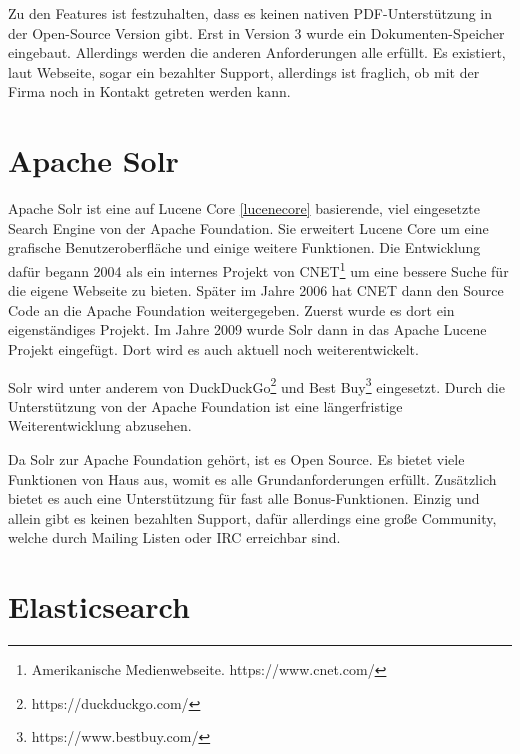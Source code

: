 Zu den Features ist festzuhalten, dass es keinen nativen PDF-Unterstützung in der Open-Source Version gibt. Erst in Version 3 wurde ein Dokumenten-Speicher eingebaut. Allerdings werden die anderen Anforderungen alle erfüllt. Es existiert, laut Webseite, sogar ein bezahlter Support, allerdings ist fraglich, ob mit der Firma noch in Kontakt getreten werden kann. \cite{SphinxTechnologiesInc.2019}

\section{Apache Solr}
\label{solr}

Apache Solr ist eine auf Lucene Core \ref{lucenecore} basierende, viel eingesetzte Search Engine von der Apache Foundation. Sie erweitert Lucene Core um eine grafische Benutzeroberfläche und einige weitere Funktionen. 
Die Entwicklung dafür begann 2004 als ein internes Projekt von CNET\footnote{Amerikanische Medienwebseite. https://www.cnet.com/} um eine bessere Suche für die eigene Webseite zu bieten. Später im Jahre 2006 hat CNET dann den Source Code an die Apache Foundation weitergegeben. Zuerst wurde es dort ein eigenständiges Projekt. Im Jahre 2009 wurde Solr dann in das Apache Lucene Projekt eingefügt. Dort wird es auch aktuell noch weiterentwickelt. \cite{Wikipedia.2019b}

Solr wird unter anderem von DuckDuckGo\footnote{https://duckduckgo.com/} und Best Buy\footnote{https://www.bestbuy.com/} eingesetzt. Durch die Unterstützung von der Apache Foundation ist eine längerfristige Weiterentwicklung abzusehen. 

Da Solr zur Apache Foundation gehört, ist es Open Source. Es bietet viele Funktionen von Haus aus, womit es alle Grundanforderungen erfüllt. Zusätzlich bietet es auch eine Unterstützung für fast alle Bonus-Funktionen. Einzig und allein gibt es keinen bezahlten Support, dafür allerdings eine große Community, welche durch Mailing Listen oder IRC erreichbar sind. \cite{TheApacheSoftwareFoundation.2019}

\section{Elasticsearch}
\label{elasticsearch}

